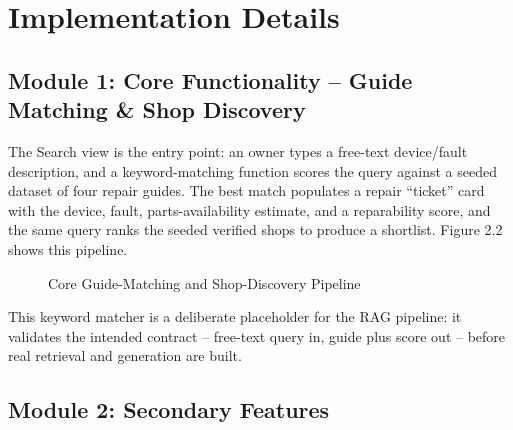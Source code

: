 \documentclass[11pt,a4paper]{report}
\begin{document}
\section{Implementation Details}

\subsection{Module 1: Core Functionality -- Guide Matching \& Shop Discovery}

The Search view is the entry point: an owner types a free-text device/fault description, and a keyword-matching function scores the query against a seeded dataset of four repair guides. The best match populates a repair ``ticket'' card with the device, fault, parts-availability estimate, and a reparability score, and the same query ranks the seeded verified shops to produce a shortlist. Figure 2.2 shows this pipeline.

\begin{figure}[h!]
\centering
{}
\caption{Core Guide-Matching and Shop-Discovery Pipeline}
\end{figure}

This keyword matcher is a deliberate placeholder for the RAG pipeline: it validates the intended contract -- free-text query in, guide plus score out -- before real retrieval and generation are built.

\subsection{Module 2: Secondary Features}
\end{document}

